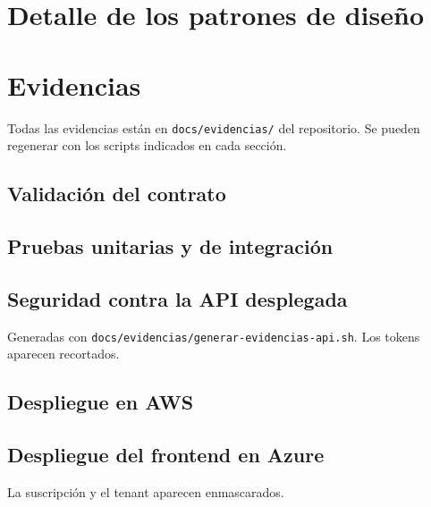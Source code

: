 \chapter{Detalle de los patrones de diseño}\label{anx:patrones}


\chapter{Evidencias}\label{anx:evidencias}

Todas las evidencias están en \texttt{docs/evidencias/} del repositorio. Se pueden regenerar con los scripts indicados en cada sección.

\section{Validación del contrato}


\section{Pruebas unitarias y de integración}


\section{Seguridad contra la API desplegada}
Generadas con \texttt{docs/evidencias/generar-evidencias-api.sh}. Los tokens aparecen recortados.


\section{Despliegue en AWS}



\section{Despliegue del frontend en Azure}
La suscripción y el tenant aparecen enmascarados.





